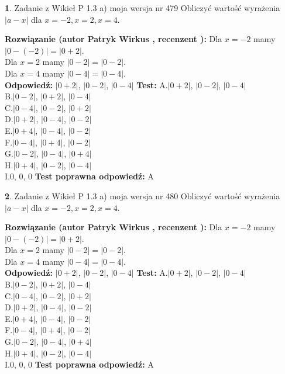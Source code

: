 \documentclass[12pt, a4paper]{article}
\theoremstyle{definition} %
\newtheorem{zad}{}
\newcommand{\zadStart}[1]{\begin{zad}#1\newline}
\newcommand{\zadStop}{\end{zad}}
\newcommand{\rozwStart}[2]{\noindent \textbf{Rozwiązanie (autor #1 , recenzent #2): }\newline}
\newcommand{\rozwStop}{\newline}
\newcommand{\odpStart}{\noindent \textbf{Odpowiedź:}\newline}
\newcommand{\odpStop}{\newline}
\newcommand{\testStart}{\noindent \textbf{Test:}\newline}
\newcommand{\testStop}{\newline}
\newcommand{\kluczStart}{\noindent \textbf{Test poprawna odpowiedź:}\newline}
\newcommand{\kluczStop}{\newline}
\begin{document}
\zadStart{Zadanie z Wikieł P 1.3 a) moja wersja nr 479}
Obliczyć wartość wyrażenia $|a - x|$ dla $x=-2,x=2,x=4$.
\zadStop
\rozwStart{Patryk Wirkus}{}
Dla $x = -2$ mamy $|0 - (-2)| = |0 + 2|$.\\
Dla $x = 2$ mamy $|0 - 2| = |0 - 2|$.\\
Dla $x = 4$ mamy $|0 - 4| = |0 - 4|$.\\
\rozwStop
\odpStart
$|0 + 2|$, $|0 - 2|$, $|0 - 4|$
\odpStop
\testStart
A.$|0 + 2|$, $|0 - 2|$, $|0 - 4|$\\
B.$|0 - 2|$, $|0 + 2|$, $|0 - 4|$\\
C.$|0 - 4|$, $|0 - 2|$, $|0 + 2|$\\
D.$|0 + 2|$, $|0 - 4|$, $|0 - 2|$\\
E.$|0 + 4|$, $|0 - 4|$, $|0 - 2|$\\
F.$|0 - 4|$, $|0 + 4|$, $|0 - 2|$\\
G.$|0 - 2|$, $|0 - 4|$, $|0 + 4|$\\
H.$|0 + 4|$, $|0 - 2|$, $|0 - 4|$\\
I.$0$, $0$, $0$
\testStop
\kluczStart
A
\kluczStop



\zadStart{Zadanie z Wikieł P 1.3 a) moja wersja nr 480}
Obliczyć wartość wyrażenia $|a - x|$ dla $x=-2,x=2,x=4$.
\zadStop
\rozwStart{Patryk Wirkus}{}
Dla $x = -2$ mamy $|0 - (-2)| = |0 + 2|$.\\
Dla $x = 2$ mamy $|0 - 2| = |0 - 2|$.\\
Dla $x = 4$ mamy $|0 - 4| = |0 - 4|$.\\
\rozwStop
\odpStart
$|0 + 2|$, $|0 - 2|$, $|0 - 4|$
\odpStop
\testStart
A.$|0 + 2|$, $|0 - 2|$, $|0 - 4|$\\
B.$|0 - 2|$, $|0 + 2|$, $|0 - 4|$\\
C.$|0 - 4|$, $|0 - 2|$, $|0 + 2|$\\
D.$|0 + 2|$, $|0 - 4|$, $|0 - 2|$\\
E.$|0 + 4|$, $|0 - 4|$, $|0 - 2|$\\
F.$|0 - 4|$, $|0 + 4|$, $|0 - 2|$\\
G.$|0 - 2|$, $|0 - 4|$, $|0 + 4|$\\
H.$|0 + 4|$, $|0 - 2|$, $|0 - 4|$\\
I.$0$, $0$, $0$
\testStop
\kluczStart
A
\kluczStop
\end{document}
